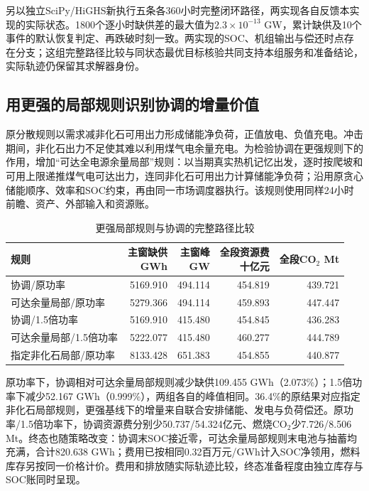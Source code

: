 另以独立SciPy/HiGHS新执行五条各360小时完整闭环路径，两实现各自反馈本实现的实际状态。1800个逐小时缺供差的最大值为$2.3\times10^{-13}$ GW，累计缺供及10个事件的默认恢复判定、再跌破时刻一致。两实现的SOC、机组输出与偿还时点存在分支；这组完整路径比较与同状态最优目标核验共同支持本组服务和准备结论，实际轨迹仍保留其求解器身份。

\subsection{用更强的局部规则识别协调的增量价值}
原分散规则以需求减非化石可用出力形成储能净负荷，正值放电、负值充电。冲击期间，非化石出力不足使其难以利用煤气电余量充电。为检验协调在更强规则下的作用，增加“可达全电源余量局部”规则：以当期真实热机记忆出发，逐时按爬坡和可用上限递推煤气电可达出力，连同非化石可用出力计算储能净负荷；沿用原贪心储能顺序、效率和SOC约束，再由同一市场调度器执行。该规则使用同样24小时前瞻、资产、外部输入和资源账。
\begin{table}[H]\centering\caption{更强局部规则与协调的完整路径比较}
\begin{tabular}{lrrrr}\toprule
规则 & \shortstack{主窗缺供\\GWh} & \shortstack{主窗峰\\GW} & \shortstack{全段资源费\\十亿元} & \shortstack{全段CO$_2$\\Mt}\\\midrule
协调/原功率 & 5169.910 & 494.114 & 454.819 & 439.721 \\
可达余量局部/原功率 & 5279.366 & 494.114 & 459.893 & 447.447 \\
协调/1.5倍功率 & 5169.910 & 415.480 & 454.845 & 436.283 \\
可达余量局部/1.5倍功率 & 5222.077 & 415.480 & 460.277 & 444.789 \\
指定非化石局部/原功率 & 8133.428 & 651.383 & 454.855 & 440.877 \\
\bottomrule\end{tabular}
\end{table}
原功率下，协调相对可达余量局部规则减少缺供109.455 GWh（2.073\%）；1.5倍功率下减少52.167 GWh（0.999\%），两组各自的峰值相同。36.4\%的原结果对应指定非化石局部规则，更强基线下的增量来自联合安排储能、发电与负荷偿还。原功率/1.5倍功率下，协调资源费分别少50.737/54.324亿元、燃烧CO$_2$少7.726/8.506 Mt。终态也随策略改变：协调末SOC接近零，可达余量局部规则末电池与抽蓄均充满，合计820.638 GWh；费用已按相同0.32百万元/GWh计入SOC净领用，燃料库存另按同一价格计价。费用和排放随实际轨迹比较，终态准备程度由独立库存与SOC账同时呈现。

